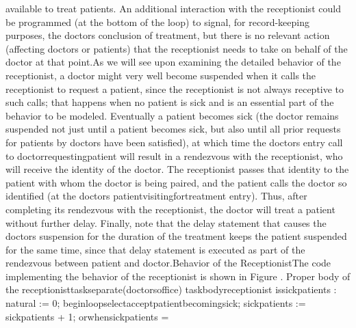 available to treat patients. An additional interaction with the receptionist
could be programmed (at the bottom of the loop) to signal, for record-keeping
purposes, the doctor\rsquo[]s conclusion of treatment, but there is
no relevant action (affecting doctors or patients) that the receptionist
needs to take on behalf of the doctor at that point.\Endpara[]
\Para[]As we will see upon examining the detailed behavior of the
receptionist, a doctor might very well become suspended when it calls
the receptionist to request a patient, since the receptionist is not
always receptive to such calls; that happens when no patient is sick
and is an essential part of the behavior to be modeled. Eventually
a patient becomes sick (the doctor remains suspended not just until
a patient becomes sick, but also until all prior requests for patients
by doctors have been satisfied), at which time the doctor\rsquo[]s
entry call to \tyxffmxmono[]doctor\Symuns[]requesting\Symuns[]patient%
\tyxffmxendmono[] will result in a rendezvous with the receptionist,
who will receive the identity of the doctor. The receptionist passes
that identity to the patient with whom the doctor is being paired,
and the patient calls the doctor so identified (at the doctor\rsquo[]s
\tyxffmxmono[]patient\Symuns[]visiting\Symuns[]for\Symuns[]treatment%
\tyxffmxendmono[] entry). Thus, after completing its rendezvous with
the receptionist, the doctor will treat a patient without further
delay. Finally, note that the delay statement that causes the doctor\rsquo[]s
suspension for the duration of the treatment keeps the patient suspended
for the same time, since that delay statement is executed as part
of the rendezvous between patient and doctor.\Endpara[]
\DivEndiv[]
\DivLiv[]\HdMinLiv[]Behavior of the Receptionist\HdMinEndiv[]
\Para[]The code implementing the behavior of the receptionist is shown
in Figure .
\Parbox[]
Proper body of the %
\tyxffmxmono[]receptionist\tyxffmxendmono[] task\FgEndcap[]
\Comp[]\tyxtstxbf[]separate\tyxtstxendbf[] (doctors\Symuns[]office)
\tyxtstxbf[]task\tyxtstxendbf[] \tyxtstxbf[]body\tyxtstxendbf[] receptionist %
\tyxtstxbf[]is\tyxtstxendbf[]
   sick\Symuns[]patients : natural := 0;
\tyxtstxbf[]begin\tyxtstxendbf[]
   \tyxtstxbf[]loop\tyxtstxendbf[]
      \tyxtstxbf[]select\tyxtstxendbf[]
         \tyxtstxbf[]accept\tyxtstxendbf[] patient\Symuns[]becoming\Symuns[]sick;
         sick\Symuns[]patients := sick\Symuns[]patients + 1;
      \tyxtstxbf[]or\tyxtstxendbf[]
      \tyxtstxbf[]when\tyxtstxendbf[] sick\Symuns[]patients  =\Symgt[]
